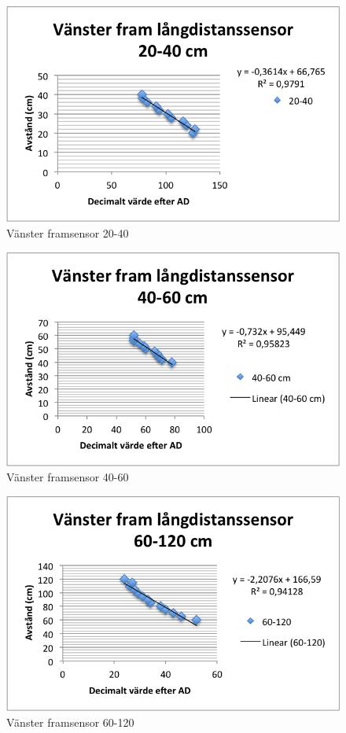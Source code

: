 \begin{figure}[H]
  \centering
 \includegraphics[angle=0,scale=1]{bilder/VF_20_40.png}
  \caption{Vänster framsensor 20-40}
\end{figure}

\begin{figure}[H]
  \centering
 \includegraphics[angle=0,scale=1]{bilder/VF_40_60.png}
  \caption{Vänster framsensor 40-60}
\end{figure}

\begin{figure}[H]
  \centering
 \includegraphics[angle=0,scale=1]{bilder/VF_60_120.png}
  \caption{Vänster framsensor 60-120}
\end{figure}






